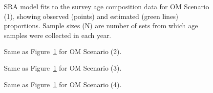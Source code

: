 \documentclass[11pt]{book}
\begin{document}
\clearpage


\begin{figure}[htb]

{\centering {} 

}

\caption{SRA model fits to the survey age composition data for OM Scenario (1), showing observed (points) and estimated (green lines) proportions. Sample sizes (N) are number of sets from which age samples were collected in each year.}\label{fig:sra-conditioned-comp-fit1}
\end{figure}
\clearpage


\begin{figure}[htb]

{\centering {} 

}

\caption{Same as Figure~\ref{fig:sra-conditioned-comp-fit1} for OM Scenario (2).}\label{fig:sra-conditioned-comp-fit2}
\end{figure}
\clearpage


\begin{figure}[htb]

{\centering {} 

}

\caption{Same as Figure~\ref{fig:sra-conditioned-comp-fit1} for OM Scenario (3).}\label{fig:sra-conditioned-comp-fit3}
\end{figure}
\clearpage


\begin{figure}[htb]

{\centering {} 

}

\caption{Same as Figure~\ref{fig:sra-conditioned-comp-fit1} for OM Scenario (4).}\label{fig:sra-conditioned-comp-fit4}
\end{figure}
\clearpage
\end{document}
